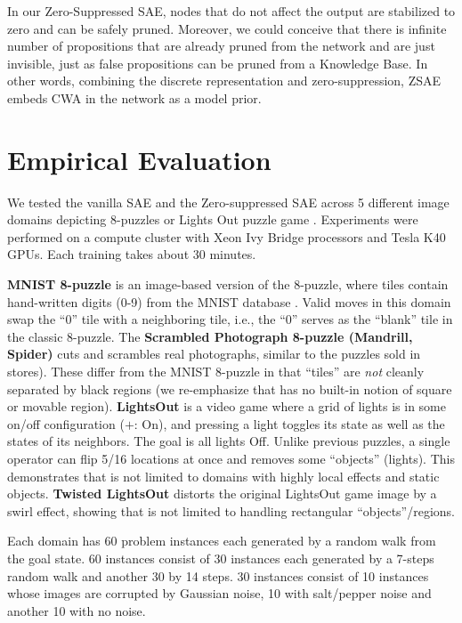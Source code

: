 In our Zero-Suppressed SAE, nodes that do not affect the output are stabilized to zero
and can be safely pruned.
Moreover, we could conceive that there is infinite number of propositions
that are already pruned from the network and are just invisible, just as false propositions
can be pruned from a Knowledge Base.
In other words, combining the discrete representation and zero-suppression,
ZSAE embeds CWA in the network as a model prior.


\section{Empirical Evaluation}
\label{evaluation}

We tested the vanilla SAE and the Zero-suppressed SAE across 5 different
image domains depicting 8-puzzles or Lights Out puzzle game \cite{lightsout}.
Experiments were performed on a compute cluster with Xeon Ivy Bridge
processors and Tesla K40 GPUs.  Each training takes about 30 minutes.

\textbf{MNIST 8-puzzle}
is an image-based version of the 8-puzzle, where tiles contain hand-written digits (0-9) from the  MNIST database \cite{lecun1998gradient}.
Valid moves in this domain swap the ``0'' tile  with a neighboring tile, i.e., the ``0'' serves as the ``blank'' tile in the classic 8-puzzle. 
The \textbf{Scrambled Photograph 8-puzzle (Mandrill, Spider)} cuts and scrambles real photographs, similar to the puzzles sold in stores).
These differ from the MNIST 8-puzzle in that ``tiles'' are \textit{not} cleanly separated by black regions
(we re-emphasize that \latentplanner has no built-in notion of square or movable region).
\textbf{LightsOut} is
a video game where a grid of lights is in some on/off configuration ($+$: On),
and pressing a light toggles its state as well as the states of its neighbors.
The goal is all lights Off.
Unlike previous puzzles, a single operator can flip 5/16 locations at once and
removes some ``objects'' (lights).
This demonstrates that \latentplanner is not limited to domains with highly local effects and static objects.
\textbf{Twisted LightsOut} distorts the original LightsOut game image by a swirl effect, 
showing that \latentplanner is not limited to handling rectangular ``objects''/regions.

Each domain has 60 problem instances each generated by a random walk from
the goal state. 60 instances consist of 30 instances each generated by a 7-steps random walk
and another 30 by 14 steps. 30 instances consist of 10 instances whose images are corrupted by Gaussian noise,
10 with salt/pepper noise and another 10 with no noise.

